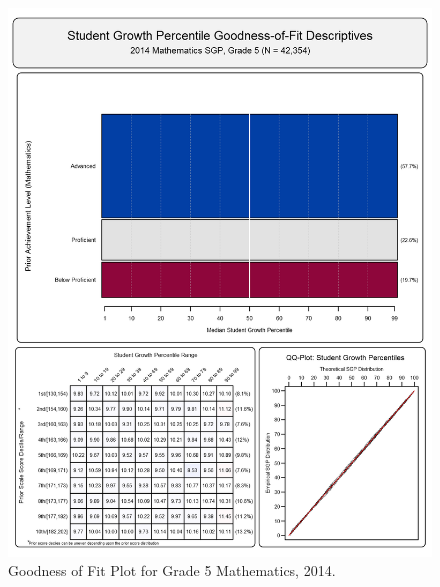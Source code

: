 \documentclass[12pt]{article}
\begin{document}
\begin{figure}[htbp]
\centering
\includegraphics{../img/Goodness_of_Fit/MATHEMATICS.2014/2014_MATH_5;2013_MATH_4;2012_MATH_3.png}
\caption{Goodness of Fit Plot for Grade 5 Mathematics, 2014.}
\end{figure}
\end{document}
